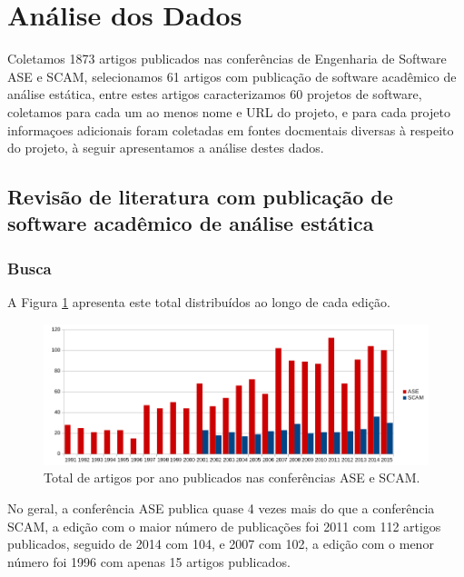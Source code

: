 
\section{Análise dos Dados} \label{estudo1:analise}

Coletamos 1873 artigos publicados nas conferências de Engenharia de Software
ASE e SCAM, selecionamos 61 artigos com publicação de software acadêmico de
análise estática, entre estes artigos caracterizamos 60 projetos de software,
coletamos para cada um ao menos nome e URL do projeto, e para cada projeto
informaçoes adicionais foram coletadas em fontes docmentais diversas à respeito
do projeto, à seguir apresentamos a análise destes dados.

\subsection{Revisão de literatura com publicação de software acadêmico de análise estática}

\subsubsection{Busca}

A Figura \ref{artigos-por-ano} apresenta este total distribuídos ao longo de
cada edição.

\begin{figure}[h]
  \center
  \includegraphics[scale=0.65]{imagens/artigos-por-ano.png}
  \caption{Total de artigos por ano publicados nas conferências ASE e SCAM.}
  \label{artigos-por-ano}
\end{figure}

No geral, a conferência ASE publica quase 4 vezes mais do que a conferência
SCAM, a edição com o maior número de publicações foi 2011 com 112 artigos
publicados, seguido de 2014 com 104, e 2007 com 102, a edição com o menor
número foi 1996 com apenas 15 artigos publicados.


